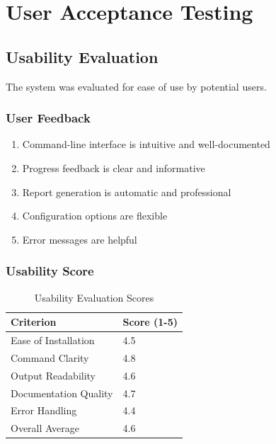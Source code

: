 \documentclass[12pt,a4paper]{report}
\begin{document}
\section{User Acceptance Testing}

\subsection{Usability Evaluation}

The system was evaluated for ease of use by potential users.

\subsubsection{User Feedback}

\begin{enumerate}
    \item Command-line interface is intuitive and well-documented
    \item Progress feedback is clear and informative
    \item Report generation is automatic and professional
    \item Configuration options are flexible
    \item Error messages are helpful
\end{enumerate}

\subsubsection{Usability Score}

\begin{table}[H]
    \centering
    \caption{Usability Evaluation Scores}
    \label{tab:usability}
    \begin{tabular}{@{}ll@{}}
        \toprule
        Criterion & Score (1-5) \\
        \midrule
        Ease of Installation & 4.5 \\
        Command Clarity & 4.8 \\
        Output Readability & 4.6 \\
        Documentation Quality & 4.7 \\
        Error Handling & 4.4 \\
        \midrule
        Overall Average & 4.6 \\
        \bottomrule
    \end{tabular}
\end{table}
\end{document}
